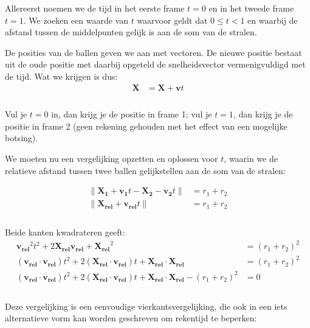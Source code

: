 \documentclass[12pt,a4paper]{article}
\begin{document}
	Allereerst noemen we de tijd in het eerste frame $t=0$ en in het tweede frame $t=1$. We zoeken een waarde van $t$ waarvoor geldt dat $0 \le t < 1$ en waarbij de afstand tussen de middelpunten gelijk is aan de som van de stralen.
	
	De posities van de ballen geven we aan met vectoren. De nieuwe positie bestaat uit de oude positie met daarbij opgeteld de snelheidsvector vermenigvuldigd met de tijd. Wat we krijgen is dus:
	\begin{equation}
		\begin{aligned}
			\mathbf{X} &= \mathbf{X} + \mathbf{v}t\\
		\end{aligned}
	\end{equation}
	\\Vul je $t=0$ in, dan krijg je de positie in frame 1; vul je $t=1$, dan krijg je de positie in frame 2 (geen rekening gehouden met het effect van een mogelijke botsing).
	
	We moeten nu een vergelijking opzetten en oplossen voor $t$, waarin we de relatieve afstand tussen twee ballen gelijkstellen aan de som van de stralen:
	
	\begin{equation}
		\begin{aligned}
			 \|\mathbf{X_1} + \mathbf{v_1}t  - \mathbf{X_2} -  \mathbf{v_2}t \| &= r_1 + r_2 \\
			 \|\mathbf{X_{rel}} + \mathbf{v_{rel}}t \| &= r_1 + r_2\\
		\end{aligned}
	\end{equation}
	\\Beide kanten kwadrateren geeft:
	\begin{equation}
		\label{botsing}
		\begin{aligned}
			\mathbf{v_{rel}}^2 t^2 + 2 \mathbf{X_{rel}} \mathbf{v_{rel}} + \mathbf{X_{rel}}^2  &= (r_1 + r_2)^2 \\
			(\mathbf{v_{rel}} \cdot \mathbf{v_{rel}})t^2 + 2(\mathbf{X_{rel}} \cdot \mathbf{v_{rel}})t + \mathbf{X_{rel}} \cdot \mathbf{X_{rel}} &= (r_1 + r_2)^2 \\
			(\mathbf{v_{rel}} \cdot \mathbf{v_{rel}})t^2 + 2(\mathbf{X_{rel}} \cdot \mathbf{v_{rel}})t + \mathbf{X_{rel}} \cdot \mathbf{X_{rel}} - (r_1 + r_2)^2 &= 0\\
		\end{aligned}
	\end{equation}
	\\Deze vergelijking is een eenvoudige vierkantsvergelijking, die ook in een iets alternatieve vorm kan worden geschreven om rekentijd te beperken:
	
\end{document}
